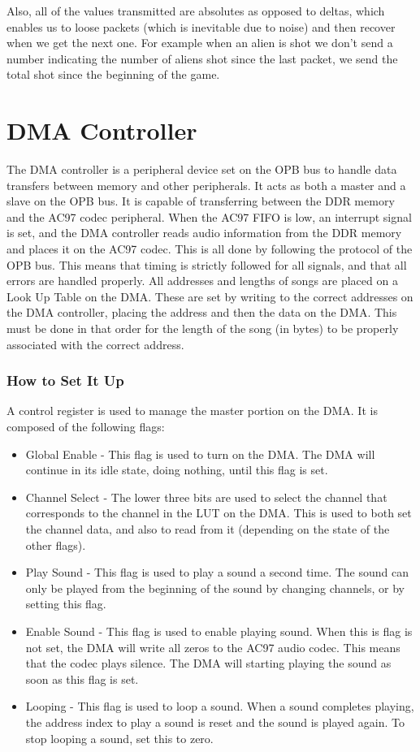 \documentclass[11pt,letter,oneside]{report}
\begin{document}
Also, all of the values transmitted are absolutes as opposed to deltas, which enables us to loose packets (which is inevitable due to noise) and then recover when we get the next one.  For example when an alien is shot we don't send a number indicating the number of aliens shot since the last packet, we send the total shot since the beginning of the game.  


\chapter{DMA Controller}
	The DMA controller is a peripheral device set on the OPB bus to handle data transfers between memory and other peripherals. It acts as both a master and a slave on the OPB bus. It is capable of transferring between the DDR memory and the AC97 codec peripheral. When the AC97 FIFO is low, an interrupt signal is set, and the DMA controller reads audio information from the DDR memory and places it on the AC97 codec. This is all done by following the protocol of the OPB bus. This means that timing is strictly followed for all signals, and that all errors are handled properly. 
	All addresses and lengths of songs are placed on a Look Up Table on the DMA. These are set by writing to the correct addresses on the DMA controller, placing the address and then the data on the DMA. This must be done in that order for the length of the song (in bytes) to be properly associated with the correct address.

\subsection{How to Set It Up}
	A control register is used to manage the master portion on the DMA. It is composed of the following flags:
\begin{itemize}
\item Global Enable - This flag is used to turn on the DMA. The DMA will continue in its idle state, doing nothing, until this flag is set.
\item Channel Select - The lower three bits are used to select the channel that corresponds to the channel in the LUT on the DMA. This is used to both set the channel data, and also to read from it (depending on the state of the other flags).
\item Play Sound - This flag is used to play a sound a second time. The sound can only be played from the beginning of the sound by changing channels, or by setting this flag.
\item Enable Sound - This flag is used to enable playing sound. When this is flag is not set, the DMA will write all zeros to the AC97 audio codec. This means that the codec plays silence. The DMA will starting playing the sound as soon as this flag is set.
\item Looping - This flag is used to loop a sound. When a sound completes playing, the address index to play a sound is reset and the sound is played again. To stop looping a sound, set this to zero.
\end{itemize}
\end{document}

